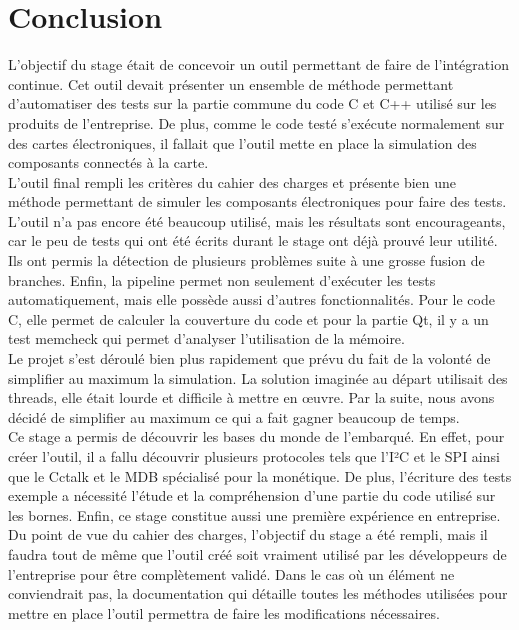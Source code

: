 \documentclass[a4paper]{article}
\begin{document}
\clearpage
\section*{Conclusion}%

L'objectif du stage était de concevoir un outil permettant de faire de
l'intégration continue. Cet outil devait présenter un ensemble de méthode
permettant d'automatiser des tests sur la partie commune du code C et C++
utilisé sur les produits de l'entreprise. De plus, comme le code testé s'exécute
normalement sur des cartes électroniques, il fallait que l'outil mette en place
la simulation des composants connectés à la carte.\\

L'outil final rempli les critères du cahier des charges et présente bien une
méthode permettant de simuler les composants électroniques pour faire des tests.
L'outil n'a pas encore été beaucoup utilisé, mais les résultats sont
encourageants, car le peu de tests qui ont été écrits durant le stage ont déjà
prouvé leur utilité. Ils ont permis la détection de plusieurs problèmes suite à
une grosse fusion de branches. Enfin, la pipeline permet non seulement
d'exécuter les tests automatiquement, mais elle possède aussi d'autres
fonctionnalités. Pour le code C, elle permet de calculer la couverture du code
et pour la partie Qt, il y a un test memcheck qui permet d'analyser
l'utilisation de la mémoire.\\

Le projet s'est déroulé bien plus rapidement que prévu du fait de la volonté de
simplifier au maximum la simulation. La solution imaginée au départ utilisait
des threads, elle était lourde et difficile à mettre en œuvre. Par la suite, nous
avons décidé de simplifier au maximum ce qui a fait gagner beaucoup de temps.\\

Ce stage a permis de découvrir les bases du monde de l'embarqué. En effet, pour
créer l'outil, il a fallu découvrir plusieurs protocoles tels que l'I²C et le
SPI ainsi que le Cctalk et le MDB spécialisé pour la monétique. De plus,
l'écriture des tests exemple a nécessité l'étude et la compréhension d'une
partie du code utilisé sur les bornes. Enfin, ce stage constitue aussi une
première expérience en entreprise.\\

Du point de vue du cahier des charges, l'objectif du stage a été rempli, mais il
faudra tout de même que l'outil créé soit vraiment utilisé par les développeurs
de l'entreprise pour être complètement validé. Dans le cas où un élément ne
conviendrait pas, la documentation qui détaille toutes les méthodes utilisées
pour mettre en place l'outil permettra de faire les modifications nécessaires.
\end{document}
